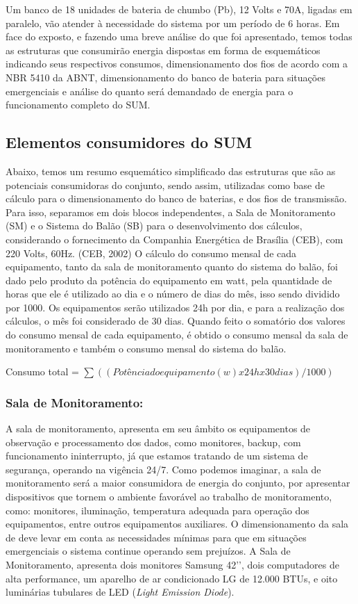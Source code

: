 Um banco de 18 unidades de bateria de chumbo (Pb), 12 Volts e 70A, ligadas em paralelo, vão atender à necessidade do sistema por um período de 6 horas.
Em face do exposto, e fazendo uma breve análise do que foi apresentado, temos todas as estruturas que consumirão energia dispostas em forma de esquemáticos indicando seus respectivos consumos, dimensionamento dos fios de acordo com a NBR 5410 da ABNT, dimensionamento do banco de bateria para situações emergenciais e análise do quanto será demandado de energia para o funcionamento completo do SUM.

\subsection{Elementos consumidores do SUM}

Abaixo, temos um resumo esquemático simplificado das estruturas que são as potenciais consumidoras do conjunto, sendo assim, utilizadas como base de cálculo para o dimensionamento do banco de baterias, e dos fios de transmissão.
	Para isso, separamos em dois blocos independentes, a Sala de Monitoramento (SM) e o Sistema do Balão (SB)  para o desenvolvimento dos cálculos, considerando o fornecimento da Companhia Energética de Brasília (CEB), com 220 Volts, 60Hz. (CEB, 2002)
	O cálculo do consumo mensal de cada equipamento, tanto da sala de monitoramento quanto do sistema do balão, foi dado pelo produto da potência do equipamento em watt, pela quantidade de horas que ele é utilizado ao dia e o número de dias do mês, isso sendo dividido por 1000. Os equipamentos serão utilizados 24h por dia, e para a realização dos cálculos, o mês foi considerado de 30 dias.
Quando feito o somatório dos valores do consumo mensal de cada equipamento, é obtido o consumo mensal da sala de monitoramento e também o consumo mensal do sistema do balão.

Consumo total =  $\sum ((Potência do equipamento(w) x 24h x 30 dias)/1000)$ %

 \subsubsection{Sala de Monitoramento:}

 A sala de monitoramento, apresenta em seu âmbito os equipamentos de observação e processamento dos dados, como monitores, backup, com funcionamento ininterrupto, já que estamos tratando de um sistema de segurança, operando na vigência 24/7.
Como podemos imaginar, a sala de monitoramento será a maior consumidora de energia do conjunto, por apresentar dispositivos que tornem o ambiente favorável ao trabalho de monitoramento, como: monitores, iluminação, temperatura adequada para operação dos equipamentos, entre outros equipamentos auxiliares. O dimensionamento da sala de deve levar em conta as necessidades mínimas para que em situações emergenciais o sistema continue operando sem prejuízos.
A Sala de Monitoramento, apresenta dois monitores Samsung 42’’, dois computadores de alta performance, um aparelho de ar condicionado LG de 12.000 BTUs, e oito luminárias tubulares de LED (\textit{Light Emission Diode}).



